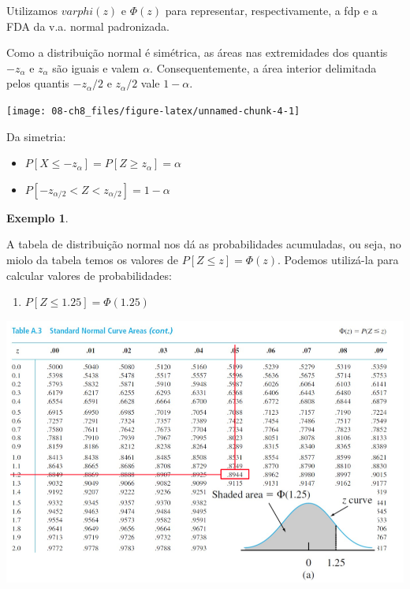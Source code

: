\documentclass[
]{book}
\providecommand{\tightlist}{%
  \setlength{\itemsep}{0pt}\setlength{\parskip}{0pt}}
\theoremstyle{definition}
\theoremstyle{definition}
\newtheorem{example}{Exemplo}[chapter]
\theoremstyle{definition}
\theoremstyle{remark}
\begin{document}
Utilizamos \(varphi(z)\) e \(\Phi(z)\) para representar, respectivamente, a fdp e a FDA da v.a. normal padronizada.

Como a distribuição normal é simétrica, as áreas nas extremidades dos quantis \(-z_\alpha\) e \(z_\alpha\) são iguais e valem \(\alpha\). Consequentemente, a área interior delimitada pelos quantis \(-z_\alpha/2\) e \(z_\alpha/2\) vale \(1 - \alpha\).

\begin{center}\texttt{[image: 08-ch8\_files/figure-latex/unnamed-chunk-4-1]} \end{center}

Da simetria:

\begin{itemize}
\tightlist
\item
  \(P[X \leq -z_\alpha] = P[Z \geq z_\alpha] = \alpha\)\\
\item
  \(P[-z_{\alpha/2} < Z < z_{\alpha/2}] = 1 - \alpha\)
\end{itemize}

\begin{example}
\protect\hypertarget{exm:unnamed-chunk-5}{}{\label{exm:unnamed-chunk-5} }
\end{example}

A tabela de distribuição normal nos dá as probabilidades acumuladas, ou seja, no miolo da tabela temos os valores de \(P[Z \leq z] = \Phi(z)\). Podemos utilizá-la para calcular valores de probabilidades:

\begin{enumerate}
\def\labelenumi{(\alph{enumi})}
\tightlist
\item
  \(P[Z \leq 1.25] = \Phi(1.25)\)
\end{enumerate}

\includegraphics[width=1\linewidth]{img/distr-normal-a}
\end{document}
